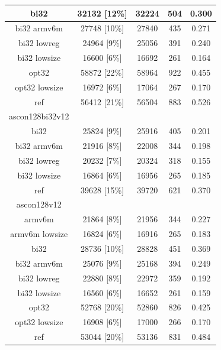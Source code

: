\documentclass[12pt,a4paper,italian]{report}
\begin{document}
\begin{table}[h]
\begin{tabular}{|c|c|c|c|c|}
        \hline
        bi32 & 32132 [12\%] & 32224 & 504 & 0.300 \\
        \hline
        bi32 armv6m & 27748 [10\%] & 27840 & 435 & 0.271 \\
        \hline
        bi32 lowreg & 24964 [9\%] & 25056 & 391 & 0.240 \\
        \hline
        bi32 lowsize & 16600 [6\%] & 16692 & 261 & 0.164 \\
        \hline
        opt32 & 58872 [22\%] & 58964 & 922 & 0.455 \\
        \hline
        opt32 lowsize & 16972 [6\%] & 17064 & 267 & 0.170 \\
        \hline
        ref & 56412 [21\%] & 56504 & 883 & 0.526 \\
        \hline
        ascon128bi32v12 & & & & \\
        \hline
        bi32 & 25824 [9\%] & 25916 & 405 & 0.201 \\
        \hline
        bi32 armv6m & 21916 [8\%] & 22008 & 344 & 0.198 \\
        \hline
        bi32 lowreg & 20232 [7\%] & 20324 & 318 & 0.155 \\
        \hline
        bi32 lowsize & 16864 [6\%] & 16956 & 265 & 0.185 \\
        \hline
        ref & 39628 [15\%] & 39720 & 621 & 0.370 \\
        \hline
        ascon128v12 & & & & \\
        \hline
        armv6m & 21864 [8\%] & 21956 & 344 & 0.227 \\
        \hline
        armv6m lowsize & 16824 [6\%] & 16916 & 265 & 0.183 \\
        \hline
        bi32 & 28736 [10\%] & 28828 & 451 & 0.369 \\
        \hline
        bi32 armv6m & 25076 [9\%] & 25168 & 394 & 0.249 \\
        \hline
        bi32 lowreg & 22880 [8\%] & 22972 & 359 & 0.192 \\
        \hline
        bi32 lowsize & 16560 [6\%] & 16652 & 261 & 0.159 \\
        \hline
        opt32 & 52768 [20\%] & 52860 & 826 & 0.425 \\
        \hline
        opt32 lowsize & 16908 [6\%] & 17000 & 266 & 0.170 \\
        \hline
        ref & 53044 [20\%] & 53136 & 831 & 0.484 \\
        \hline
    \end{tabular}
\end{table}
\end{document}
